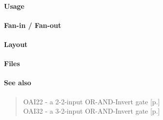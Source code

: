 \paragraph{Usage}

\paragraph{Fan-in / Fan-out}

\paragraph{Layout}

\paragraph{Files}

\paragraph{See also}
\begin{quote}
    OAI22 - a 2-2-input OR-AND-Invert gate [p.\pageref{OAI22}] \\
    OAI32 - a 3-2-input OR-AND-Invert gate [p.\pageref{OAI32}]
\end{quote}

